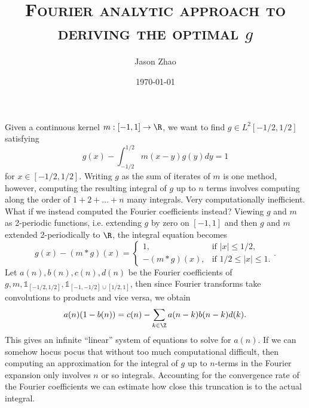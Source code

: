 \documentclass[11pt, reqno]{article}
\title
{
	\textsc{Fourier analytic approach to deriving the optimal $g$}
}
\author{Jason Zhao}
\date{\today}
\theoremstyle{definition}
\theoremstyle{remark}
\begin{document}
\maketitle

Given a continuous kernel $m : [-1, 1] \to \R$, we want to find $g \in L^2 [-1/2, 1/2]$ satisfying 
	\[ g(x) - \int_{-1/2}^{1/2} m(x - y) g(y) dy = 1 \]
for $x \in [-1/2, 1/2]$. Writing $g$ as the sum of iterates of $m$ is one method, however, computing the resulting integral of $g$ up to $n$ terms involves computing along the order of $1 + 2 + \dots + n$ many integrals. Very computationally inefficient. What if we instead computed the Fourier coefficients instead? Viewing $g$ and $m$ as 2-periodic functions, i.e. extending $g$ by zero on $[-1,1]$ and then $g$ and $m$ extended 2-periodically to $\R$, the integral equation becomes
	\[ g(x) - (m * g) (x) = \begin{cases} 1, & \text{if } |x| \leq 1/2, \\ -(m * g)(x), &\text{if } 1/2 \leq |x| \leq 1. \end{cases}.  \]
Let $a(n), b(n), c(n), d(n)$ be the Fourier coefficients of $g, m, {\mathbb 1}_{[-1/2, 1/2]}, {\mathbb 1}_{[-1, -1/2] \cup [1/2, 1]}$, then since Fourier transforms take convolutions to products and vice versa, we obtain
	\[ a(n) (1 - b(n)) = c(n) - \sum_{k \in \Z} a(n - k) b(n - k) d(k). \]
This gives an infinite ``linear'' system of equations to solve for $a(n)$. If we can somehow hocus pocus that without too much computational difficult, then computing an approximation for the integral of $g$ up to $n$-terms in the Fourier expansion only involves $n$ or so integrals. Accounting for the convergence rate of the Fourier coefficients we can estimate how close this truncation is to the actual integral. 		 
\end{document}
